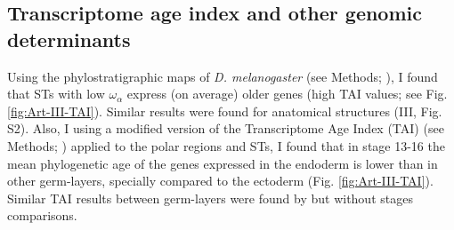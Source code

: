 \subsection{Transcriptome age index and other genomic determinants}
Using the phylostratigraphic maps of \textit{D. melanogaster} (see Methods; \citealp{Drost2015}), I found that STs with low $\omega_{\alpha}$ express (on average) older genes (high TAI values; see Fig. \ref{fig:Art-III-TAI}). Similar results were found for anatomical structures (III, Fig. S2).
%
%
Also, I using a modified version of the Transcriptome Age Index (TAI) (see Methods; \citealp{Domazet-Loso2010}) applied to the polar regions and STs, I found that in stage 13-16 the mean phylogenetic age of the genes expressed in the endoderm is lower than in other germ-layers, specially compared to the ectoderm (Fig. \ref{fig:Art-III-TAI}).
Similar TAI results between germ-layers were found by \citet{Domazet-Loso2007} but without stages comparisons.

